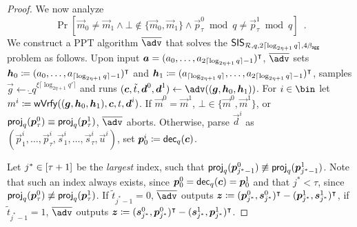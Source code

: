 \begin{proof}
  We now analyze 
  \[
    \Pr[\vec{m}_0\neq \vec{m}_1 \land \bot\not\in\{\vec{m}_0,\vec{m}_1\} \land \vec{p}_\tau^0 \bmod q \neq \vec{p}_\tau^1 \bmod q]\enspace.
  \]
  We construct a PPT algorithm $\sisadv$ that solves the $\mathsf{SIS}_{\mathcal{R},q,2\lceil\log_{2\eta+1} q\rceil,4\beta_{\mathsf{agg}}}$ problem as follows.
  Upon input $\boldsymbol{a}=(a_0,\dots,a_{2\lceil\log_{2\eta+1} q\rceil-1})^\intercal$,
  $\sisadv$ sets 
  $\boldsymbol{h}_0\coloneqq(a_0,\dots,a_{\lceil\log_{2\eta+1} q\rceil-1})^\intercal$ and 
  $\boldsymbol{h}_1 \coloneqq (a_{\lceil\log_{2\eta+1} q\rceil},\dots,a_{2\lceil\log_{2\eta+1} q\rceil-1})^\intercal$,
  samples $\vec{g} \gets \ring_q^{\xi\lceil\log_{2\eta+1} q'\rceil}$ and runs 
  $(\vec{c},\tilde t,\vec{d}^0,\vec{d}^1) \gets \adv((\vec{g},\vec{h}_0,\vec{h}_1))$.
  For $i\in\bin$ let $m^i \coloneqq \mathsf{wVrfy}((\boldsymbol{g},\boldsymbol{h}_0,\boldsymbol{h}_1),\boldsymbol{c},t,\boldsymbol{d}^i)$.
  If $\vec{m}^0 = \vec{m}^1$, $\bot\in\{\vec{m}^0,\vec{m}^1\}$, or $\mathsf{proj}_q(\boldsymbol{p}_\tau^0) \equiv \mathsf{proj}_q(\boldsymbol{p}_\tau^1)$, $\sisadv$ aborts.
  Otherwise, parse $\vec{d}^i$ as $(\vec{p}^i_1,\dots,\vec{p}^i_{\tau},\vec{s}^i_1,\dots,\vec{s}^i_\tau,\vec{u}^i)$, set $\boldsymbol{p}^i_0 \coloneqq \mathsf{dec}_q(\boldsymbol{c})$.
  
  Let $j^*\in [\tau+1]$ be the \emph{largest} index, such that $\mathsf{proj}_q(\boldsymbol{p}^0_{j^*-1})\not\equiv\mathsf{proj}_q(\boldsymbol{p}^1_{j^*-1})$.
  Note that such an index always exists, since $\boldsymbol{p}^0_0 = \mathsf{dec}_q(\boldsymbol{c}) = \boldsymbol{p}^1_0$ and that $j^* < \tau$, since $\mathsf{proj}_q(\boldsymbol{p}_\tau^0) \not \equiv \mathsf{proj}_q(\boldsymbol{p}_\tau^1)$.
  If $\tilde t_{j^*-1} = 0$, $\sisadv$ outputs $
  \boldsymbol{z}\coloneqq(\boldsymbol{p}_{j^*}^0, \boldsymbol{s}_{j^*}^0)^\intercal - (\boldsymbol{p}_{j^*}^1, \boldsymbol{s}_{j^*}^1)^\intercal$, if $\tilde t_{j^*-1} = 1$, $\sisadv$ outputs $\boldsymbol{z}\coloneqq(\boldsymbol{s}_{j^*}^0, \boldsymbol{p}_{j^*}^0)^\intercal - (\boldsymbol{s}_{j^*}^1, \boldsymbol{p}_{j^*}^1)^\intercal$.
  

\end{proof}
